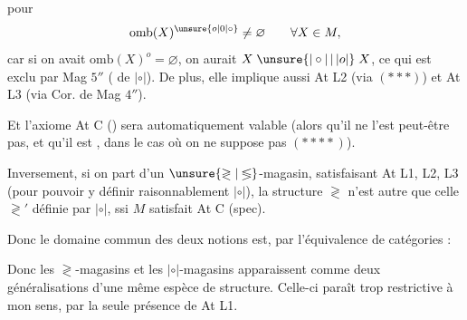 pour
\[
\mathrm{omb}(X)^{\unsure{o|0|\circ}}\ne\varnothing\qquad\forall X\in M,
\]
car si on avait $\mathrm{omb}(X)^o=\varnothing$, on aurait $X\mathrel{\unsure{|\circ|\,|\,|o|}}X$, ce qui est exclu par Mag $5''$ ( de $|\circ|$). De plus, elle implique aussi At L2 (via $(***)$) et At L3 (via  Cor. de Mag $4''$).

Et l'axiome At C () sera automatiquement valable (alors qu'il ne l'est peut-être pas, et qu'il est , dans le cas où on ne suppose pas $(****)$).

Inversement, si on part d'un $\unsure{\gtrless|\lessgtr}$-magasin, satisfaisant At L1, L2, L3 (pour pouvoir y définir raisonnablement $|\circ|$), la structure $\gtrless$ n'est autre que celle $\gtrless'$ définie par $|\circ|$, ssi $M$ satisfait At C (spec).

Donc le domaine commun des deux notions est,  par l'équivalence de catégories :

Donc les $\gtrless$-magasins et les $|\circ|$-magasins apparaissent comme deux  généralisations d'une même espèce de structure. Celle-ci paraît trop restrictive à mon sens, par la seule présence de At L1.
